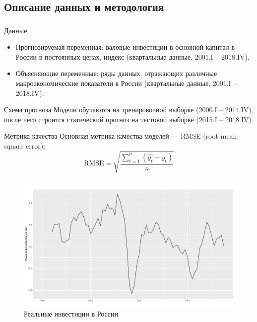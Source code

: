 \documentclass[c, dvipsnames]{beamer}  %
\begin{document}
\subsection{Описание данных и методология}
\begin{frame}[shrink=10]
\frametitle{\insertsection} 
\framesubtitle{\insertsubsection}
\begin{block}{Данные}
\begin{itemize}
        \item Прогнозируемая переменная: валовые инвестиции в основной капитал в России в постоянных ценах, индекс (квартальные данные, 2001.I -- 2018.IV),
    \item Объясняющие переменные: ряды данных, отражающих различные макроэкономические показатели в России (квартальные данные, 2001.I -- 2018.IV).
\end{itemize}
\end{block}
\begin{block}{Схема прогноза}
Модели обучаются на тренировочной выборке (2000.I -- 2014.IV), после чего строится статический прогноз на тестовой выборке (2015.I -- 2018.IV).
\end{block}




\begin{block}{Метрика качества}
Основная метрика качества моделей --- RMSE (root-mean-square error):
\begin{equation}
   \text{RMSE} = \sqrt{ \frac{\sum_{t = 1}^{n} (\hat{y_t} - y_t)}{n}} 
\end{equation}
\end{block}

\end{frame}

 \begin{frame}
\frametitle{\insertsection} 
\begin{figure}
\caption{Реальные инвестиции в России}
\includegraphics[width=\linewidth]{lineplot2.pdf}
\end{figure}
\end{frame} 
\end{document}
